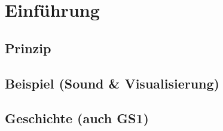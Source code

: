 \section{Einführung}

\subsection{Prinzip}
\subsection{Beispiel (Sound \& Visualisierung)}
\subsection{Geschichte (auch GS1)}